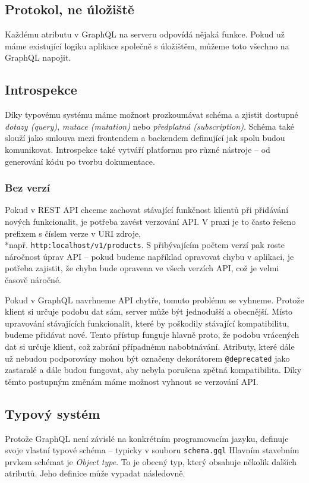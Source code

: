 \documentclass[thesis=M,czech]{FITthesis}[2019/12/23]
\begin{document}
\subsection*{Protokol, ne úložiště}
Každému atributu v GraphQL na serveru odpovídá nějaká funkce. Pokud už máme existující logiku aplikace společně s úložištěm, můžeme toto všechno na GraphQL napojit.

\subsection*{Introspekce}
Díky typovému systému máme možnost prozkoumávat schéma a zjistit dostupné \textit{dotazy (query)}, \textit{mutace (mutation)} nebo \textit{předplatná (subscription)}. Schéma také slouží jako smlouva mezi frontendem a backendem definující jak spolu budou komunikovat.
Introspekce také vytváří platformu pro různé nástroje -- od generování kódu po tvorbu dokumentace.

\subsubsection*{Bez verzí}
Pokud v REST API chceme zachovat stávající funkčnost klientů při přidávání nových funkcionalit, je potřeba zavést verzování API. V praxi je to často řešeno prefixem s číslem verze v URI zdroje,\\*např. \texttt{http:localhost/v1/products}. S přibývajícím počtem verzí pak roste náročnost úprav API -- pokud budeme například opravovat chybu v aplikaci, je potřeba zajistit, že chyba bude opravena ve všech verzích API, což je velmi časově náročné.

Pokud v GraphQL navrhneme API chytře, tomuto problému se vyhneme. Protože klient si určuje podobu dat sám, server může být jednodušší a obecnější. Místo upravování stávajících funkcionalit, které by poškodily stávající kompatibilitu, budeme přidávat nové. Tento přístup funguje hlavně proto, že podobu vrácených dat si určuje klient, což zabrání případnému nabobtnávání. Atributy, které dále už nebudou podporovány mohou být označeny dekorátorem \texttt{@deprecated} jako zastaralé a dále budou fungovat, aby nebyla porušena zpětná kompatibilita. Díky těmto postupným změnám máme možnost vyhnout se verzování API.

\subsection{Typový systém}
Protože GraphQL není závislé na konkrétním programovacím jazyku, definuje svoje vlastní typové schéma -- typicky v souboru \texttt{schema.gql}
Hlavním stavebním prvkem schémat je \textit{Object type}. To je obecný typ, který obsahuje několik dalších atributů. Jeho definice může vypadat následovně. 
\end{document}
